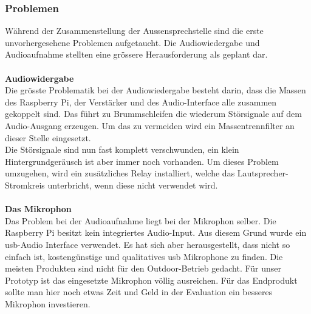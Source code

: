 \subsubsection{Problemen}
Während der Zusammenstellung der Aussensprechstelle sind die erste unvorhergesehene Problemen aufgetaucht. Die Audiowiedergabe und Audioaufnahme stellten eine grössere Herausforderung als geplant dar.
\\
\\
\textbf{Audiowidergabe} 
\\
Die grösste Problematik bei der Audiowiedergabe besteht darin, dass die Massen des Raspberry Pi, der Verstärker und des Audio-Interface alle zusammen gekoppelt sind. Das führt zu Brummschleifen die wiederum Störsignale auf dem Audio-Ausgang erzeugen. Um das zu vermeiden wird ein Massentrennfilter an dieser Stelle eingesetzt.
\\
Die Störsignale sind nun fast komplett verschwunden, ein klein Hintergrundgeräusch ist aber immer noch vorhanden. Um dieses Problem umzugehen, wird ein zusätzliches Relay installiert, welche das Lautsprecher-Stromkreis unterbricht, wenn diese nicht verwendet wird.
\\
\\
\textbf{Das Mikrophon}
\\
Das Problem bei der Audioaufnahme liegt bei der Mikrophon selber. Die Raspberry Pi besitzt kein integriertes Audio-Input. Aus diesem Grund wurde ein \gls{usb}-Audio Interface verwendet. Es hat sich aber herausgestellt, dass nicht so einfach ist, kostengünstige und qualitatives \gls{usb} Mikrophone zu finden. Die meisten Produkten sind nicht für den Outdoor-Betrieb gedacht. Für unser Prototyp ist das eingesetzte Mikrophon völlig ausreichen. Für das Endprodukt sollte man hier noch etwas Zeit und Geld in der Evaluation ein besseres Mikrophon investieren.
\newpage